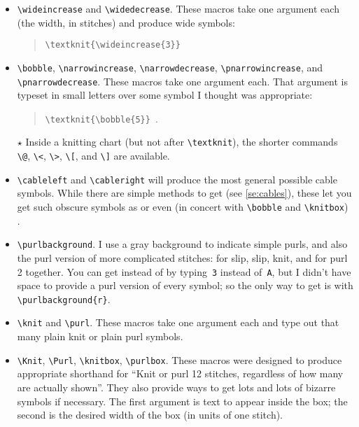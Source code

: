\documentclass[draft]{amsart}
\begin{document}
\begin{itemize}

\item \verb|\wideincrease| and \verb|\widedecrease|. These macros take one argument each (the width, in stitches) and produce wide symbols:
\begin{quote}
\verb|\textknit{\wideincrease{3}}| 
\end{quote}

\item \verb|\bobble|, \verb|\narrowincrease|, \verb|\narrowdecrease|, \verb|\pnarrow|\-\verb|increase|, and  \verb|\pnarrow|\-\verb|decrease|. These macros take one argument each. That argument is typeset in small letters over some symbol I thought was appropriate:
\begin{quote}
\verb|\textknit{\bobble{5}}|~.
\end{quote}

\item[$\star$] Inside a knitting chart (but not after \verb|\textknit|), the shorter commands \verb|\@|, \verb|\<|, \verb|\>|, \verb|\[|, and \verb|\]| are available.

\item \verb|\cableleft| and \verb|\cableright| will produce the most general possible cable symbols. While there are simple methods to get {\knitnogrid {}} (see \autoref{se:cables}), these let you get such obscure symbols as  or even (in concert with \verb|\bobble| and \verb|\knitbox|) .

\item \verb|\purlbackground|. I use a gray background to indicate simple purls, and also the purl version of more complicated stitches: \textknit{<} for slip, slip, knit, and \textknit{;} for purl 2 together. You can get  instead of  by typing~\texttt{3} instead of~\texttt{A}, but I didn't have space to provide a purl version of every symbol; so the only way to get  is with \verb|\purlbackground{r}|.

\item \verb|\knit| and \verb|\purl|. These macros take one argument each and type out that many plain knit or plain purl symbols.

\item \verb|\Knit|, \verb|\Purl|, \verb|\knitbox|, \verb|\purlbox|. These macros were designed to produce appropriate shorthand for ``Knit or purl 12 stitches, regardless of how many are actually shown''. They also provide ways to get lots and lots of bizarre symbols if necessary. The first argument is text to appear inside the box; the second is the desired width of the box (in units of one stitch). 


\end{itemize}
\end{document}
